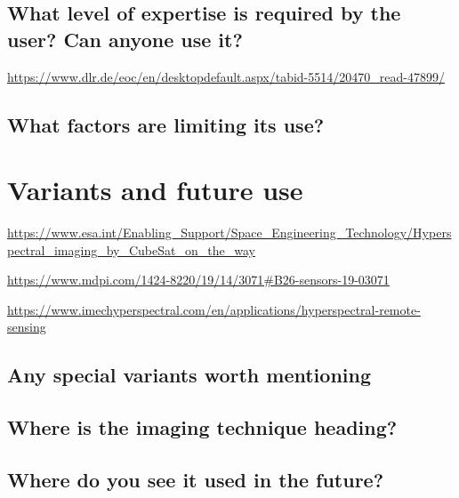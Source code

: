 \documentclass[a4paper]{article}
\begin{document}
    \subsection*{What level of expertise is required by the user? Can anyone use it?}
        \url{https://www.dlr.de/eoc/en/desktopdefault.aspx/tabid-5514/20470_read-47899/}
    \subsection*{What factors are limiting its use?}


\section{Variants and future use}

\url{https://www.esa.int/Enabling_Support/Space_Engineering_Technology/Hyperspectral_imaging_by_CubeSat_on_the_way}

\url{https://www.mdpi.com/1424-8220/19/14/3071#B26-sensors-19-03071}

\url{https://www.imechyperspectral.com/en/applications/hyperspectral-remote-sensing}

    \subsection*{Any special variants worth mentioning}

    \subsection*{Where is the imaging technique heading? }

    \subsection*{Where do you see it used in the future?}






\end{document}
